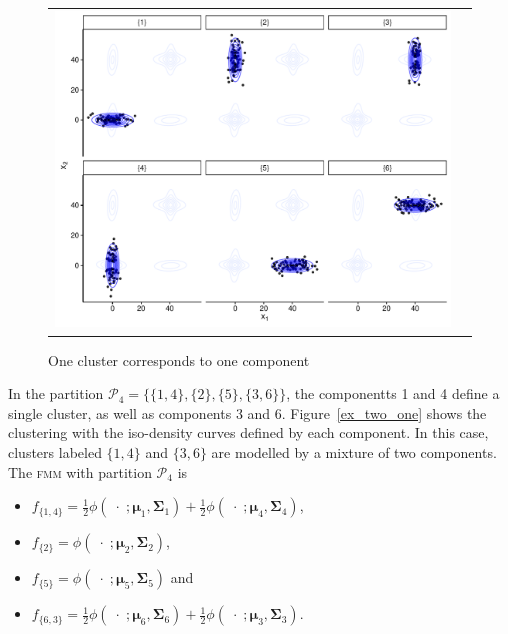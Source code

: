 \documentclass[10pt, a4paper]{article}
\newcommand{\m}[1]{\boldsymbol{#1}}
\newcommand{\fmm}{\textsc{fmm}\xspace}
\begin{document}
\begin{spacing}{1.9}
\begin{figure}[h]
\begin{center}
\begin{tabular}{cc}
  \includegraphics[width=\textwidth]{figures/partition-example-part6.pdf} \\
 \end{tabular}
 \caption{One cluster corresponds to one component}\label{ex_one_one}
\end{center}
\end{figure}

In the partition $\mathcal{P}_4 = \{ \{1, 4\},\{2\}, \{5\}, \{3, 6\} \}$, the componentts 1 and 4 define a single cluster, as well as components 3 and 6. Figure~\ref{ex_two_one} shows the clustering with the iso-density curves defined by each component. In this case, clusters labeled $\{1,4\}$ and $\{3, 6\}$ are modelled by a mixture of two components. The \fmm with partition $\mathcal{P}_4$ is
\begin{itemize}
\item $f_{\{1,4\}} = \frac{1}{2} \phi(\;\cdot\; ;  \m\mu_1, \m\Sigma_1) + \frac{1}{2} \phi(\;\cdot\; ;  \m\mu_4, \m\Sigma_4)$, 
\item $f_{\{2\}} = \phi(\;\cdot\; ;  \m\mu_2, \m\Sigma_2)$, 
\item $f_{\{5\}} = \phi(\;\cdot\; ;  \m\mu_5, \m\Sigma_5)$ and
\item $f_{\{6,3\}} = \frac{1}{2} \phi(\;\cdot\; ;  \m\mu_6, \m\Sigma_6) + \frac{1}{2} \phi(\;\cdot\; ;  \m\mu_3, \m\Sigma_3)$.
\end{itemize}


\end{spacing}
\end{document}
